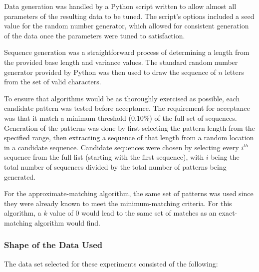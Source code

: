 Data generation was handled by a Python script written to allow almost all parameters of the resulting data to be tuned. The script's options included a seed value for the random number generator, which allowed for consistent generation of the data once the parameters were tuned to satisfaction.

Sequence generation was a straightforward process of determining a length from the provided base length and variance values. The standard random number generator provided by Python was then used to draw the sequence of $n$ letters from the set of valid characters.

To ensure that algorithms would be as thoroughly exercised as possible, each candidate pattern was tested before acceptance. The requirement for acceptance was that it match a minimum threshold (0.10\%) of the full set of sequences. Generation of the patterns was done by first selecting the pattern length from the specified range, then extracting a sequence of that length from a random location in a candidate sequence. Candidate sequences were chosen by selecting every $i^{th}$ sequence from the full list (starting with the first sequence), with $i$ being the total number of sequences divided by the total number of patterns being generated.

For the approximate-matching algorithm, the same set of patterns was used since they were already known to meet the minimum-matching criteria. For this algorithm, a $k$ value of 0 would lead to the same set of matches as an exact-matching algorithm would find.

\subsubsection{Shape of the Data Used}

The data set selected for these experiments consisted of the following:

